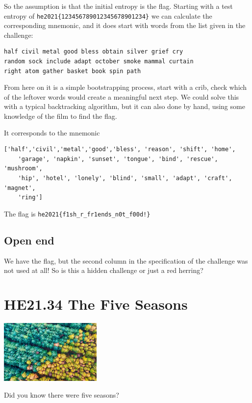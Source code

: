 \documentclass[english,a4paper,nols,noindent]{tufte-handout}
\begin{document}
So the assumption is that the initial entropy is the flag.  Starting with a test
entropy of \verb+he2021{123456789012345678901234}+ we can calculate the
corresponding mnemonic, and it does start with words from the list given in the
challenge:

\begin{verbatim} 
half civil metal good bless obtain silver grief cry
random sock include adapt october smoke mammal curtain 
right atom gather basket book spin path 
\end{verbatim}

From here on it is a simple bootstrapping process, start with a crib, check
which of the leftover words would create a meaningful next step.  We could solve
this with a typical backtracking algorithm, but it can also done by hand, using
some knowledge of the film to find the flag.

It corresponds to the mnemonic 
\begin{verbatim}
['half','civil','metal','good','bless', 'reason', 'shift', 'home',
    'garage', 'napkin', 'sunset', 'tongue', 'bind', 'rescue', 'mushroom',
    'hip', 'hotel', 'lonely', 'blind', 'small', 'adapt', 'craft', 'magnet',
    'ring']
\end{verbatim}

The flag is \verb+he2021{f1sh_r_fr1ends_n0t_f00d!}+

\subsection{Open end}
We have the flag, but the second column in the specification of the challenge
was not used at all!  So is this a hidden challenge or just a red herring?

\hypertarget{he21.34}{%
\section{HE21.34 The Five Seasons}
  \label{he21.34}}
\begin{marginfigure}
    \includegraphics[width=50mm]{images/challenge34.jpg}
\end{marginfigure}

\noindent Did you know there were five seasons?
\end{document}
